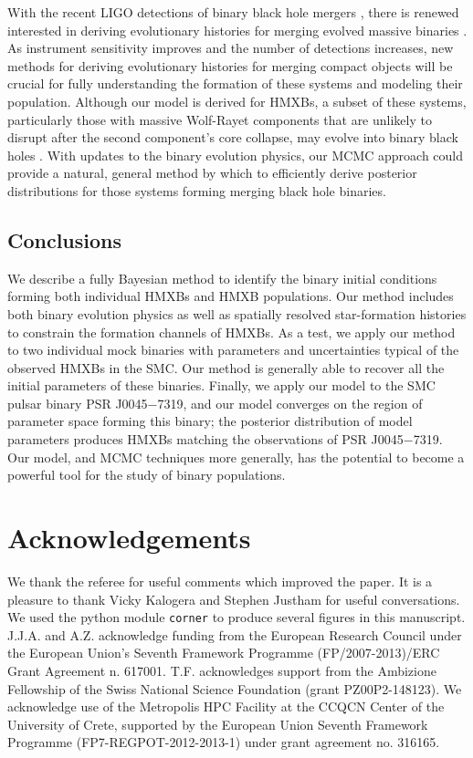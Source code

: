 \documentclass[usenatbib]{mnras}
\begin{document}
With the recent LIGO detections of binary black hole mergers \citep{abbott16a,abbott16b}, there is renewed interested in deriving evolutionary histories for merging evolved massive binaries \citep{belczynski16}. As instrument sensitivity improves and the number of detections increases, new methods for deriving evolutionary histories for merging compact objects will be crucial for fully understanding the formation of these systems and modeling their population. Although our model is derived for HMXBs, a subset of these systems, particularly those with massive Wolf-Rayet components that are unlikely to disrupt after the second component's core collapse, may evolve into binary black holes \citep{belczynski13,maccarone14}. With updates to the binary evolution physics, our MCMC approach could provide a natural, general method by which to efficiently derive posterior distributions for those systems forming merging black hole binaries. 



\subsection{Conclusions}
\label{sec:conclusions}


We describe a fully Bayesian method to identify the binary initial conditions forming both individual HMXBs and HMXB populations. Our method includes both binary evolution physics as well as spatially resolved star-formation histories to constrain the formation channels of HMXBs. As a test, we apply our method to two individual mock binaries with parameters and uncertainties typical of the observed HMXBs in the SMC. Our method is generally able to recover all the initial parameters of these binaries. Finally, we apply our model to the SMC pulsar binary PSR J0045$-$7319, and our model converges on the region of parameter space forming this binary; the posterior distribution of model parameters produces HMXBs matching the observations of PSR J0045$-$7319. Our model, and MCMC techniques more generally, has the potential to become a powerful tool for the study of binary populations.







\section*{Acknowledgements}
We thank the referee for useful comments which improved the paper. It is a pleasure to thank Vicky Kalogera and Stephen Justham for useful conversations. We used the python module {\tt corner} \citep{dfm_corner} to produce several figures in this manuscript. J.J.A. and A.Z. acknowledge funding from the European Research Council under the European Union's Seventh Framework Programme (FP/2007-2013)/ERC Grant Agreement n. 617001. T.F. acknowledges support from the Ambizione Fellowship of the Swiss National Science Foundation (grant PZ00P2-148123). We acknowledge use of the Metropolis HPC Facility at the CCQCN Center of the University of Crete, supported by the European Union Seventh Framework Programme (FP7-REGPOT-2012-2013-1) under grant agreement no. 316165.
\end{document}
